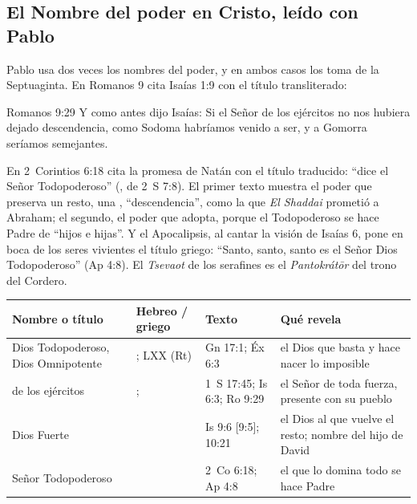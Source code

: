 \subsection{El Nombre del poder en Cristo, leído con Pablo}

Pablo usa dos veces los nombres del poder, y en ambos casos los toma de la Septuaginta. En Romanos 9 cita Isaías 1:9 con el título transliterado:

\begin{verso}{Romanos 9:29}
Y como antes dijo Isaías: Si el Señor de los ejércitos no nos hubiera dejado descendencia, como Sodoma habríamos venido a ser, y a Gomorra seríamos semejantes.
\end{verso}

En 2~Corintios 6:18 cita la promesa de Natán con el título traducido: ``dice el Señor Todopoderoso'' (, de 2~S 7:8). El primer texto muestra el poder que preserva un resto, una , ``descendencia'', como la que \emph{El Shaddai} prometió a Abraham; el segundo, el poder que adopta, porque el Todopoderoso se hace Padre de ``hijos e hijas''. Y el Apocalipsis, al cantar la visión de Isaías 6, pone en boca de los seres vivientes el título griego: ``Santo, santo, santo es el Señor Dios Todopoderoso'' (Ap 4:8). El \emph{Tsevaot} de los serafines es el \emph{Pantokrátōr} del trono del Cordero.

\begin{center}\small\renewcommand{\arraystretch}{1.25}
\begin{tabular}{@{}L{3.4cm}L{3.6cm}L{3.0cm}L{4.4cm}@{}}
\toprule
\textbf{Nombre o título} & \textbf{Hebreo / griego} & \textbf{Texto} & \textbf{Qué revela} \\ \midrule
Dios Todopoderoso, Dios Omnipotente & ; LXX  (Rt) & Gn 17:1; Éx 6:3 & el Dios que basta y hace nacer lo imposible \\
\SENOR{} de los ejércitos & ;  & 1~S 17:45; Is 6:3; Ro 9:29 & el Señor de toda fuerza, presente con su pueblo \\
Dios Fuerte &  & Is 9:6 [9:5]; 10:21 & el Dios al que vuelve el resto; nombre del hijo de David \\
Señor Todopoderoso &  & 2~Co 6:18; Ap 4:8 & el que lo domina todo se hace Padre \\
\bottomrule
\end{tabular}\end{center}

